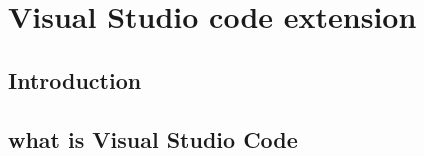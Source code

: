 \chapter{Visual Studio code extension}
\label{chap:VS_code_extension}

\section{Introduction}

\section{what is Visual Studio Code}



